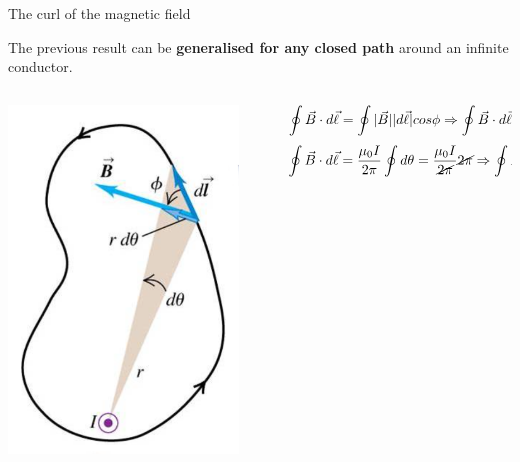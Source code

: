 %
%
%

\begin{frame}{The curl of the magnetic field}

The previous result can be {\bf generalised for any closed path} around an infinite conductor.\\

\begin{columns}
  \begin{column}{0.20\textwidth}
    \includegraphics[width=0.90\textwidth]{./images/schematics/magnetic_field_path_integral_generalisation_any_shape.png}
  \end{column}
  \begin{column}{0.80\textwidth}
      \begin{equation*}
         \oint \vec{B} \cdot d\vec{\ell} = \oint |\vec{B}| |d\vec{\ell}| cos\phi \Rightarrow
         \oint \vec{B} \cdot d\vec{\ell} = \oint \Big( \frac{\mu_0 I}{2\pi \cancel{r}} \Big) \Big( \cancel{r} \; d\theta \Big) \Rightarrow
      \end{equation*}
      \begin{equation*}
         \oint \vec{B} \cdot d\vec{\ell} =  \frac{\mu_0 I}{2\pi} \oint d\theta =   \frac{\mu_0 I}{\cancel{2\pi}} \cancel{2\pi}  \Rightarrow
         \oint \vec{B} \cdot d\vec{\ell} =  \mu_0 I
      \end{equation*}
  \end{column}
\end{columns}


\end{frame}
